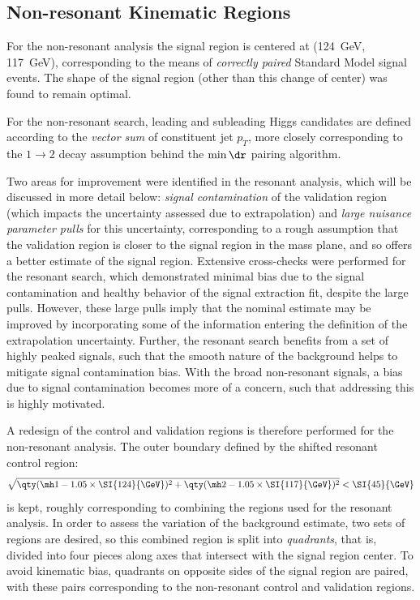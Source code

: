 \subsection{Non-resonant Kinematic Regions}
For the non-resonant analysis the signal region is centered at (\SI{124}{\GeV}, \SI{117}{\GeV}),
corresponding to the means of \emph{correctly paired} Standard Model signal events. The shape of 
the signal region (other than this change of center) was found to remain optimal.

For the non-resonant search, leading and subleading Higgs candidates are defined according to the 
\emph{vector sum} of constituent jet $p_{T}$, more closely corresponding to the $1\rightarrow 2$ decay assumption
behind the $\min{\dr}$ pairing algorithm. 

Two areas for improvement were identified in the resonant analysis, which will be discussed in more detail below: 
\emph{signal contamination} of the validation region (which impacts the uncertainty assessed due to extrapolation)
and \emph{large nuisance parameter pulls} for this uncertainty, corresponding to a rough assumption that the 
validation region is closer to the signal region in the mass plane, and so offers a better estimate of the 
signal region. Extensive cross-checks were performed for the resonant search, which demonstrated minimal 
bias due to the signal contamination and healthy behavior of the signal extraction fit, despite 
the large pulls. However, these large pulls imply that the nominal estimate may be improved by 
incorporating some of the information entering the definition of the extrapolation uncertainty. Further, 
the resonant search benefits from a set of highly peaked signals, such that the smooth nature of the 
background helps to mitigate signal contamination bias. With the broad non-resonant signals, 
a bias due to signal contamination becomes more of a concern, such that addressing this is highly 
motivated.

A redesign of the control and validation regions is therefore performed for 
the non-resonant analysis. The outer boundary defined by the shifted resonant control region:
\begin{equation}
	\label{eqn:ctrl-reg-def}
	\sqrt{\qty(\mh1 - 1.05 \times \SI{124}{\GeV})^{2} + \qty(\mh2 - 1.05 \times
		\SI{117}{\GeV})^{2}} < \SI{45}{\GeV}
\end{equation}
is kept, roughly corresponding to combining the regions used for the resonant analysis. In order 
to assess the variation of the background estimate, two sets of regions are desired, so this combined 
region is split into \emph{quadrants}, that is, divided into four pieces along axes that intersect 
with the signal region center. To avoid kinematic bias, quadrants on opposite sides of the signal 
region are paired, with these pairs corresponding to the non-resonant control and validation regions.

